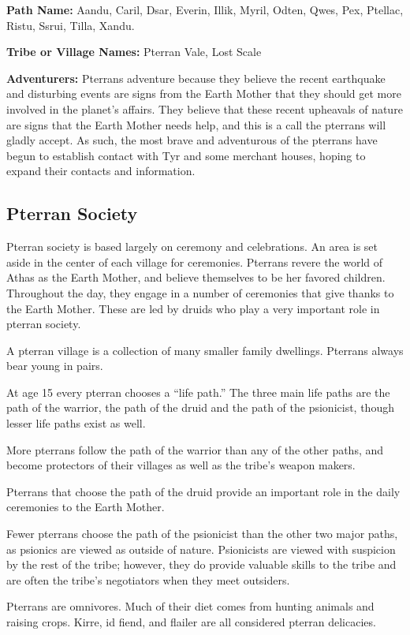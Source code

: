 \documentclass[10pt,a4paper,twocolumn]{d20}
\begin{document}
{\textbf{Path Name:} Aandu, Caril, Dsar, Everin, Illik, Myril, Odten, Qwes, Pex, Ptellac, Ristu, Ssrui, Tilla, Xandu.

\textbf{Tribe or Village Names:} Pterran Vale, Lost Scale

\textbf{Adventurers:} Pterrans adventure because they believe the recent earthquake and disturbing events are signs from the Earth Mother that they should get more involved in the planet’s affairs. They believe that these recent upheavals of nature are signs that the Earth Mother needs help, and this is a call the pterrans will gladly accept. As such, the most brave and adventurous of the pterrans have begun to establish contact with Tyr and some merchant houses, hoping to expand their contacts and information.

\subsection{Pterran Society}
Pterran society is based largely on ceremony and celebrations. An area is set aside in the center of each village for ceremonies. Pterrans revere the world of Athas as the Earth Mother, and believe themselves to be her favored children. Throughout the day, they engage in a number of ceremonies that give thanks to the Earth Mother. These are led by druids who play a very important role in pterran society.

A pterran village is a collection of many smaller family dwellings. Pterrans always bear young in pairs.

At age 15 every pterran chooses a ``life path.'' The three main life paths are the path of the warrior, the path of the druid and the path of the psionicist, though lesser life paths exist as well.

More pterrans follow the path of the warrior than any of the other paths, and become protectors of their villages as well as the tribe’s weapon makers.

Pterrans that choose the path of the druid provide an important role in the daily ceremonies to the Earth Mother.

Fewer pterrans choose the path of the psionicist than the other two major paths, as psionics are viewed as outside of nature. Psionicists are viewed with suspicion by the rest of the tribe; however, they do provide valuable skills to the tribe and are often the tribe’s negotiators when they meet outsiders.

Pterrans are omnivores. Much of their diet comes from hunting animals and raising crops. Kirre, id fiend, and flailer are all considered pterran delicacies.

}
\end{document}

